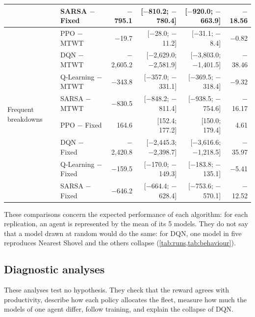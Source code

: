 \documentclass[11pt,a4paper]{article}
\newif\ifrevmarks
\newcommand{\revtag}[1]{\ifrevmarks\textsuperscript{\textcolor{red!70!black}{\scriptsize[#1]}}\fi}
\newenvironment{revbloc}[1]{\par\ifrevmarks\color{revcolor}\noindent\revtag{#1}\ \fi}{\par}
\newif\ifcorrmarks
\newcommand{\corr}[1]{\ifcorrmarks\textcolor{corrcolor}{#1}\else#1\fi}
\newenvironment{corrbloc}{\par\ifcorrmarks\color{corrcolor}\fi}{\par}
\begin{document}
\begin{revbloc}{T31}
\begin{corrbloc}
\begin{table}[H]
\begin{tabular}{@{}llrrrr@{}}
 & SARSA $-$ Fixed & $-$795.1 & [$-$810.2; $-$780.4] & [$-$920.0; $-$663.9] & $-$18.56 \\
\midrule
\multirow{8}{*}{Frequent breakdowns} & PPO $-$ MTWT & $-$19.7 & [$-$28.0; $-$11.2] & [$-$31.1; $-$8.4] & $-$0.82 \\
 & DQN $-$ MTWT & $-$2{,}605.2 & [$-$2{,}629.0; $-$2{,}581.9] & [$-$3{,}803.0; $-$1{,}401.5] & $-$38.46 \\
 & Q-Learning $-$ MTWT & $-$343.8 & [$-$357.0; $-$331.1] & [$-$369.5; $-$318.4] & $-$9.32 \\
 & SARSA $-$ MTWT & $-$830.5 & [$-$848.2; $-$811.4] & [$-$938.5; $-$754.6] & $-$16.17 \\
 & PPO $-$ Fixed & 164.6 & [152.4; 177.2] & [150.0; 179.4] & 4.61 \\
 & DQN $-$ Fixed & $-$2{,}420.8 & [$-$2{,}445.3; $-$2{,}398.7] & [$-$3{,}616.6; $-$1{,}218.5] & $-$35.97 \\
 & Q-Learning $-$ Fixed & $-$159.5 & [$-$170.0; $-$149.3] & [$-$183.8; $-$135.1] & $-$5.41 \\
 & SARSA $-$ Fixed & $-$646.2 & [$-$664.4; $-$628.4] & [$-$753.6; $-$570.1] & $-$12.52 \\
\bottomrule
\end{tabular}
\end{table}
\end{corrbloc}

These comparisons concern the expected performance of each algorithm: for each replication, an agent is represented by the mean of its 5 models. They do not say that a model drawn at random would do the same: for DQN, one model in five reproduces Nearest Shovel and the others collapse (\cref{tab:runs,tab:behaviour}).
\end{revbloc}

\subsection{\corr{Diagnostic analyses}}
\label{sec:diagnostics}

\begin{corrbloc}
These analyses test no hypothesis. They check that the reward agrees with productivity, describe how each policy allocates the fleet, measure how much the models of one agent differ, follow training, and explain the collapse of DQN.
\end{corrbloc}
\end{document}
